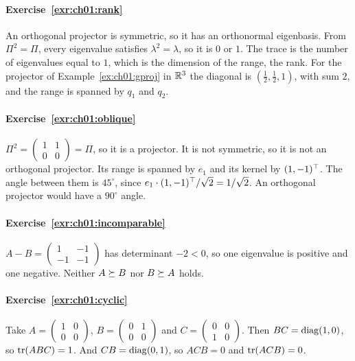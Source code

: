 
\paragraph{Exercise~\ref{exr:ch01:rank}}
An orthogonal projector is symmetric, so it has an orthonormal eigenbasis. From
$\Pi^2=\Pi$, every eigenvalue satisfies $\lambda^2=\lambda$, so it is $0$ or
$1$. The trace is the number of eigenvalues equal to $1$, which is the dimension
of the range, the rank. For the projector of Example~\ref{ex:ch01:gproj} in $\mathbb{R}^3$ the
diagonal is $(\tfrac12,\tfrac12,1)$, with sum $2$, and the range is spanned by
$q_1$ and $q_2$.

\paragraph{Exercise~\ref{exr:ch01:oblique}}
$\Pi^2=\begin{pmatrix}1&1\\0&0\end{pmatrix}=\Pi$, so it is a projector. It is not
symmetric, so it is not an orthogonal projector. Its range is spanned by $e_1$
and its kernel by $(1,-1)^{\top}$. The angle between them is $45^\circ$, since
$e_1\cdot(1,-1)^{\top}/\sqrt2=1/\sqrt2$. An orthogonal projector would have a
$90^\circ$ angle.

\paragraph{Exercise~\ref{exr:ch01:incomparable}}
$A-B=\begin{pmatrix}1&-1\\-1&-1\end{pmatrix}$ has determinant $-2<0$, so one
eigenvalue is positive and one negative. Neither $A\succeq B$ nor $B\succeq A$ holds.

\paragraph{Exercise~\ref{exr:ch01:cyclic}}
Take $A=\begin{pmatrix}1&0\\0&0\end{pmatrix}$, $B=\begin{pmatrix}0&1\\0&0\end{pmatrix}$
and $C=\begin{pmatrix}0&0\\1&0\end{pmatrix}$. Then $BC=\operatorname{diag}(1,0)$, so
$\operatorname{tr}(ABC)=1$. And $CB=\operatorname{diag}(0,1)$, so $ACB=0$ and $\operatorname{tr}(ACB)=0$.

